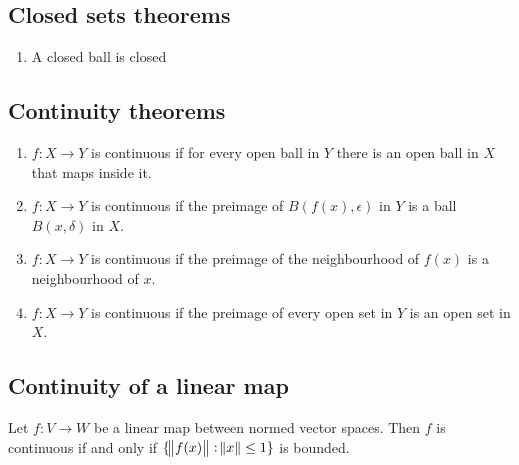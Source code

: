 \subsection{Closed sets theorems}
\begin{enumerate}
\item A closed ball is closed
\end{enumerate}


\subsection{Continuity theorems}
\begin{enumerate}
\item $f:X \to Y$ is continuous if for every open ball in $Y$ there is an open ball in $X$ that
  maps inside it.
\item $f:X \to Y$ is continuous if the preimage of $B(f(x), \epsilon)$ in $Y$ is a ball
  $B(x, \delta)$ in $X$.
\item $f:X \to Y$ is continuous if the preimage of the neighbourhood of $f(x)$ is a neighbourhood
  of $x$.
\item $f:X \to Y$ is continuous if the preimage of every open set in $Y$ is an open set in $X$.
\end{enumerate}


\subsection{Continuity of a linear map}
\begin{theorem}
  Let $f:V \to W$ be a linear map between normed vector spaces. Then $f$ is continuous if and only
  if $\{\norm{f(x)} : \norm{x} \leq 1\}$ is bounded.
\end{theorem}

